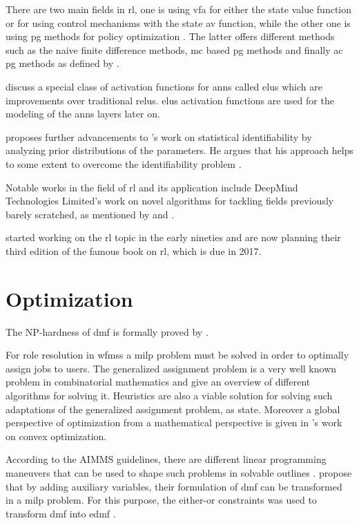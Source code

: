 There are two main fields in \gls{rl}, one is using \gls{vfa} for either the state value function or for using control mechanisms with the state \gls{av} function, while the other one is using \gls{pg} methods for policy optimization \citep{Sutton2017}. The latter offers different methods such as the naive finite difference methods, \gls{mc} based \gls{pg} methods and finally \gls{ac} \gls{pg} methods as defined by \citet{Silver2014}.

\citet{Clevert2015} discuss a special class of activation functions for \glspl{ann} called \glspl{elu} which are improvements over traditional \glspl{relu}. \glspl{elu} activation functions are used for the modeling of the \glspl{ann} layers later on.

\citet{Gershman2016} proposes further advancements to \citet{Zhang2011}'s work on statistical identifiability by analyzing prior distributions of the parameters. He argues that his approach helps to some extent to overcome the identifiability problem \citep{Gershman2016}.

Notable works in the field of \gls{rl} and its application include DeepMind Technologies Limited's work on novel algorithms for tackling fields previously barely scratched, as mentioned by \citet{Mnih2015} and \citet{Silver2016}.

\citet{Sutton2017} started working on the \gls{rl} topic in the early nineties and are now planning their third edition of the famous book on \gls{rl}, which is due in 2017.

\section{Optimization}
\label{sec:optimization}

The NP-hardness of \gls{dmf} is formally proved by \citet{Garey1990}.

For role resolution in \glspl{wfms} a \gls{milp} problem must be solved in order to optimally assign jobs to users. The generalized assignment problem is a very well known problem in combinatorial mathematics and \citet{Cattrysse1992} give an overview of different algorithms for solving it. Heuristics are also a viable solution for solving such adaptations of the generalized assignment problem, as \citet{Racer1994} state. Moreover a global perspective of optimization from a mathematical perspective is given in \citet{Boyd2004}'s work on convex optimization.

According to the AIMMS guidelines, there are different linear programming maneuvers that can be used to shape such problems in solvable outlines \citep{Bisschop2016}. \citet{Zeng2005} propose that by adding auxiliary variables, their formulation of \gls{dmf} can be transformed in a \gls{milp} problem. For this purpose, the either-or constraints was used to transform \gls{dmf} into \gls{edmf} \citep[p. 77]{Bisschop2016}.

